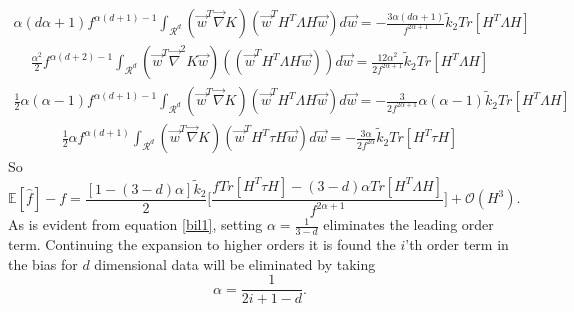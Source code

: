 \begin{equation}
	\begin{split}
		\alpha(d\alpha+1)f^{\alpha(d+1)-1}\int_{\mathcal{R}^d}(\vec{w}^T\vec{\nabla}K)(\vec{w}^TH^T\Lambda H\vec{w})d\vec{w}=-\frac{3\alpha(d\alpha+1)}{f^{2\alpha+1}}\tilde{k}_2Tr[H^T\Lambda H]
	\end{split}
\end{equation}
\begin{equation}
	\begin{split}
		\frac{\alpha^2}{2}f^{\alpha(d+2)-1}\int_{\mathcal{R}^d}(\vec{w}^T\vec{\nabla}^2K\vec{w})((\vec{w}^TH^T\Lambda H\vec{w}))d\vec{w}=\frac{12\alpha^2}{2f^{2\alpha+1}}\tilde{k}_2Tr[H^T\Lambda H]
	\end{split}
\end{equation}
\begin{equation}
	\begin{split}
		\frac{1}{2}\alpha(\alpha-1)f^{\alpha(d+1)-1}\int_{\mathcal{R}^d}(\vec{w}^T\vec{\nabla}K)(\vec{w}^TH^T\Lambda H\vec{w})d\vec{w}=-\frac{3}{2f^{2\alpha+1}}\alpha(\alpha-1)\tilde{k}_2Tr[H^T\Lambda H]
	\end{split}
\end{equation}
\begin{equation}
	\begin{split}
		\frac{1}{2}\alpha f^{\alpha(d+1)}\int_{\mathcal{R}^d}(\vec{w}^T\vec{\nabla}K)(\vec{w}^TH^T\tau H\vec{w})d\vec{w}=-\frac{3\alpha}{2f^{2\alpha}} \tilde{k}_2Tr[H^T\tau H]
	\end{split}
\end{equation}
So
\begin{equation}
	\mathbb{E}[\hat{f}]-f=\frac{[1-(3-d)\alpha]\tilde{k}_2}{2}\bigg[\frac{fTr[H^T\tau H]-(3-d)\alpha Tr[H^T\Lambda H]}{f^{2\alpha+1}}\bigg]+\mathcal{O}(H^3).
	\label{bil1}
\end{equation}
As is evident from equation \eqref{bil1}, setting $\alpha=\frac{1}{3-d}$ eliminates the leading order term. Continuing the expansion to higher orders it is found the $i$'th order term in the bias for $d$ dimensional data will be eliminated by taking 
\begin{equation}
	\alpha=\frac{1}{2i+1-d}.
\end{equation}